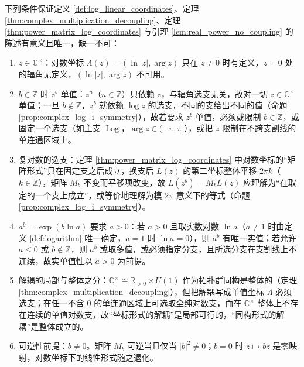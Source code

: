 \begin{property}\label{prop:power_preconditions}
下列条件保证定义 \ref{def:log_linear_coordinates}、定理 \ref{thm:complex_multiplication_decoupling}、定理 \ref{thm:power_matrix_log_coordinates} 与引理 \ref{lem:real_power_no_coupling} 的陈述有意义且唯一，缺一不可：
\begin{enumerate}[label=(\roman*)]
    \item $z\in\mathbb{C}^{\times}$：对数坐标 $\Lambda(z)=(\ln|z|,\arg z)$ 只在 $z\neq0$ 时有定义，$z=0$ 处的辐角无定义，$(\ln|z|,\arg z)$ 不可用。
    \item $b\in\mathbb{Z}$ 时 $z^b$ 单值：$z^n$（$n\in\mathbb{Z}$）只依赖 $z$，与辐角选支无关，故对一切 $z\in\mathbb{C}^{\times}$ 单值；一旦 $b\notin\mathbb{Z}$，$z^b$ 就依赖 $\log z$ 的选支，不同的支给出不同的值（命题 \ref{prop:complex_log_i_symmetry}），故若要求 $z^b$ 单值，必须或限制 $b\in\mathbb{Z}$，或固定一个选支（如主支 $\operatorname{Log}$，$\arg z\in(-\pi,\pi]$），或把 $z$ 限制在不跨支割线的单连通区域上。
    \item 复对数的选支：定理 \ref{thm:power_matrix_log_coordinates} 中对数坐标的“矩阵形式”只在固定支之后成立，换支后 $L(z)$ 的第二坐标整体平移 $2\pi k$（$k\in\mathbb{Z}$），矩阵 $M_b$ 不变而平移项改变，故 $L(z^b)=M_bL(z)$ 应理解为“在取定的一个支上成立”，或等价地理解为模 $2\pi$ 意义下的等式（命题 \ref{prop:complex_log_i_symmetry}）。
    \item $a^b=\exp(b\ln a)$ 要求 $a>0$：若 $a>0$ 且取实数对数 $\ln a$（$a\neq1$ 时由定义 \ref{def:logarithm} 唯一确定，$a=1$ 时 $\ln a=0$），则 $a^b$ 有唯一实值；若允许 $a\le0$ 或 $b\notin\mathbb{Z}$，则 $a^b$ 或取多值，或必须指定分支，且所选分支在支割线上不连续，故实单值性以 $a>0$ 为前提。
    \item 解耦的局部与整体之分：$\mathbb{C}^{\times}\cong\mathbb{R}_{>0}\times U(1)$ 作为拓扑群同构是整体的（定理 \ref{thm:complex_multiplication_decoupling}），但把解耦写成单值坐标 $\Lambda$ 必须选支；在任一不含 $0$ 的单连通区域上可选取全纯对数支，而在 $\mathbb{C}^{\times}$ 整体上不存在连续的单值对数支，故“坐标形式的解耦”是局部可行的，“同构形式的解耦”是整体成立的。
    \item 可逆性前提：$b\neq0$。矩阵 $M_b$ 可逆当且仅当 $|b|^2\neq0$；$b=0$ 时 $z\mapsto bz$ 是零映射，对数坐标下的线性形式随之退化。
\end{enumerate}
\end{property}

